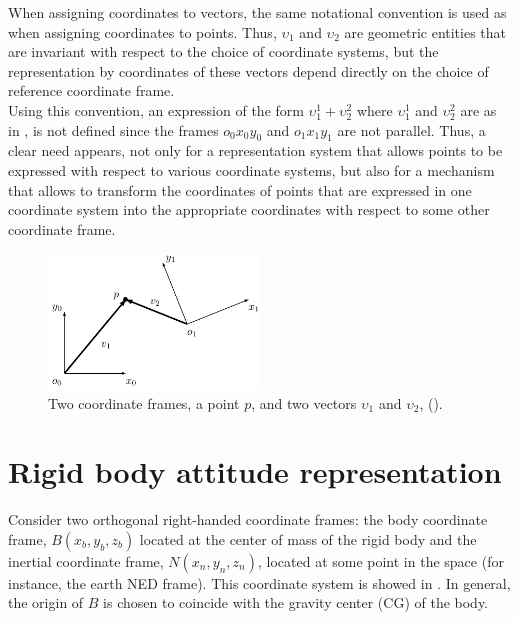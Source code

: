  When assigning coordinates to vectors, the same notational convention is used as when assigning coordinates to points. Thus, $\upsilon_1$ and $\upsilon_2$ are geometric entities that are invariant with respect to the choice of coordinate systems, but the representation by coordinates of these vectors depend directly on the choice of reference coordinate frame.\\
 Using this convention, an expression of the form $\upsilon_1^1+\upsilon_2^2$ where $\upsilon_1^1$ and $\upsilon_2^2$ are as in , is not defined since the frames $o_0x_0y_0$ and $o_1x_1y_1$ are not parallel. Thus, a clear need appears, not only for a representation system that allows points to be expressed with respect to various coordinate systems, but also for a mechanism that allows to transform the coordinates of points that are expressed in one coordinate system into the appropriate coordinates with respect to some other coordinate frame.
 \begin{figure}[h]
     \centering
     \includegraphics[width =0.5\textwidth]{figures/frame_pos.pdf}
     \caption{Two coordinate frames, a point $p$, and two vectors $\upsilon_1$ and $\upsilon_2$, (\cite{Spong:2004}).}
     \label{fig:frame_pos}
   \end{figure}

 \section{Rigid body attitude representation}

 Consider two orthogonal right-handed coordinate frames: the body coordinate frame, $B(x_b,y_b,z_b)$ located at the center of mass of the rigid body and the inertial coordinate frame, $N(x_n,y_n,z_n)$, located at some point in the space (for instance, the earth NED frame). This coordinate system is showed in . In general, the origin of $B$ is chosen to coincide with the gravity center (CG) of the body.

